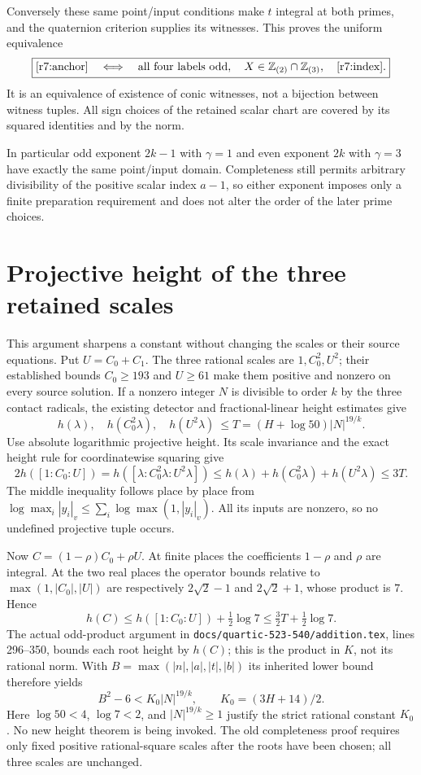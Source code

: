 Conversely these same point/input conditions make $t$ integral at both
primes, and the quaternion criterion supplies its witnesses.  This
proves the uniform equivalence
\[
 \boxed{\eqref{r7:anchor}\quad\Longleftrightarrow\quad
 \text{all four labels odd},\quad
 X\in\mathbb Z_{(2)}\cap\mathbb Z_{(3)},\quad\eqref{r7:index}.}
\]
It is an equivalence of existence of conic witnesses, not a bijection
between witness tuples.  All sign choices of the retained scalar chart
are covered by its squared identities and by the norm.

In particular odd exponent $2k-1$ with $\gamma=1$ and even exponent
$2k$ with $\gamma=3$ have exactly the same point/input domain.
Completeness still permits arbitrary divisibility of the positive
scalar index $a-1$, so either exponent imposes only a finite preparation
requirement and does not alter the order of the later prime choices.

\section{Projective height of the three retained scales}

This argument sharpens a constant without changing the scales or their
source equations.  Put $U=C_0+C_1$.  The three rational scales are
$1,C_0^2,U^2$; their established bounds $C_0\ge193$ and $U\ge61$
make them positive and nonzero on every source solution.  If a nonzero
integer $N$ is divisible to order $k$ by the three contact radicals,
the existing detector and fractional-linear height estimates give
\[
 h(\lambda),\quad h(C_0^2\lambda),\quad h(U^2\lambda)
 \ \le T=(H+\log50)|N|^{19/k}.
\]
Use absolute logarithmic projective height.  Its scale invariance and
the exact height rule for coordinatewise squaring give
\[
 2h([1:C_0:U])
 =h([\lambda:C_0^2\lambda:U^2\lambda])
 \le h(\lambda)+h(C_0^2\lambda)+h(U^2\lambda)
 \le3T.
\]
The middle inequality follows place by place from
$\log\max_i|y_i|_v\le\sum_i\log\max(1,|y_i|_v)$.
All its inputs are nonzero, so no undefined projective tuple occurs.

Now $C=(1-\rho)C_0+\rho U$.  At finite places the coefficients
$1-\rho$ and $\rho$ are integral.  At the two real places the operator
bounds relative to $\max(1,|C_0|,|U|)$ are respectively
$2\sqrt2-1$ and $2\sqrt2+1$, whose product is $7$.  Hence
\[
 h(C)\le h([1:C_0:U])+\tfrac12\log7
 \le\tfrac32 T+\tfrac12\log7.
\]
The actual odd-product argument in
\texttt{docs/quartic-523-540/addition.tex}, lines 296--350, bounds each
root height by $h(C)$; this is the product in $K$, not its rational norm.
With $B=\max(|n|,|a|,|t|,|b|)$ its inherited lower bound therefore yields
\begin{equation}\label{r7:height}
 B^2-6 < K_0 |N|^{19/k},\qquad K_0=(3H+14)/2.
\end{equation}
Here $\log50<4$, $\log7<2$, and $|N|^{19/k}\ge1$ justify the strict
rational constant $K_0$.  No new height theorem is being invoked.
The old completeness proof requires only fixed positive rational-square
scales after the roots have been chosen; all three scales are unchanged.

